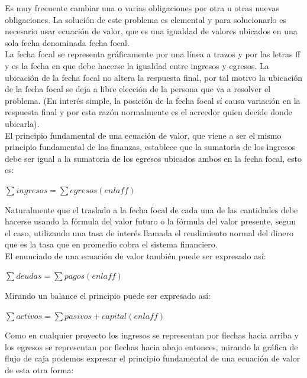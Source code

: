 Es muy frecuente cambiar una o varias obligaciones por otra u otras nuevas obligaciones. La solución de este problema es elemental y para solucionarlo es necesario usar ecuación de valor, que es una igualdad de valores ubicados en una sola fecha denominada fecha focal.\\

La fecha focal se representa gráficamente por una línea a trazos y por las letras ff y es la fecha en que debe hacerse la igualdad entre ingresos y egresos. La ubicación de la fecha focal no altera la respuesta final, por tal motivo la ubicación de la fecha focal se deja a libre elección de la persona que va a resolver el problema. (En interés simple, la posición de la fecha focal sí causa variación en la respuesta final y por esta razón normalmente es el acreedor quien decide donde ubicarla).\\

El principio fundamental de una ecuación de valor, que viene a ser el mismo principio fundamental de las finanzas, establece que la sumatoria de los ingresos debe ser igual a la sumatoria de los egresos ubicados ambos en la fecha focal, esto es:

\begin{center}
	$\sum ingresos = \sum egresos(en la ff)$\\
\end{center}
Naturalmente que el traslado a la fecha focal de cada una de las cantidades debe hacerse usando la fórmula del valor futuro o la fórmula del valor presente, segun el caso, utilizando una tasa de interés llamada el rendimiento normal del dinero que es la tasa que en promedio cobra el sistema financiero.\\

El enunciado de una ecuación de valor también puede ser expresado así:

\begin{center}
	$\sum deudas = \sum pagos(en la ff)$\\
\end{center}

Mirando un balance el principio puede ser expresado así:\\

\begin{center}
	$\sum activos = \sum pasivos + capital(en la ff)$\\
\end{center}

Como en cualquier proyecto los ingresos se representan por flechas hacia arriba y los egresos se representan por flechas hacia abajo entonces, mirando la gráfica de flujo de caja podemos expresar el principio fundamental de una ecuación de valor de esta otra forma:\\

